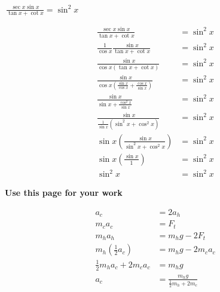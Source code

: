 \documentclass[addpoints]{exam}
\begin{document}
\begin{tcolorbox}[breakable, title=TRIG IDENTITIES, colframe=black, sharp corners, colback=white, colbacktitle=white, coltitle=black]
\begin{questions}
            \question \(\displaystyle\, \frac{\sec x \sin x}{\tan x + \cot x} = \sin^2 x\)
            \begin{solution}[\stretch{1}]
              \begin{align*}
                \frac{\sec x \sin x}{\tan x + \cot x} &= \sin^2 x \\ 
                \frac{1}{\cos x}\frac{\sin x}{\tan x + \cot x} &= \sin^2 x \\ 
                \frac{\sin x}{\cos x\left(\tan x + \cot x\right)} &= \sin^2 x \\ 
                \frac{\sin x}{\cos x \left(\frac{\sin x}{\cos x} + \frac{\cos x}{\sin x}\right)}& = \sin^2 x \\ 
                \frac{\sin x}{\sin x + \frac{\cos^2 x}{\sin x}} &= \sin^2 x \\ 
                \frac{\sin x}{\frac{1}{\sin x}\left(\sin^2 x + \cos^2 x\right)} &= \sin^2 x \\ 
                \sin x\left(\frac{\sin x}{\sin^2 x + \cos^2 x}\right) &= \sin^2 x \\ 
                \sin x\left(\frac{\sin x}{1}\right) &= \sin^2 x \\ 
                \sin^2 x &= \sin^2 x
              \end{align*}
            \end{solution}
        \end{questions}
    \end{tcolorbox}
    \ifprintanswers
    \else 
    \newpage 
      \begin{center}
        \large\textbf{Use this page for your work}
      \end{center}
    \fi

    \newpage 
    \begin{align}
      a_c &= 2a_h \\ 
      m_{c}a_{c} &= F_t \\ 
      m_{h}a_{h} &= m_{h}g - 2F_t \\ 
      m_{h}\left(\frac{1}{2}a_c\right) &= m_{h}g-2m_{c}a_{c} \\ 
      \frac{1}{2}m_{h}a_{c} + 2m_{c}a_{c} &= m_{h}g \\ 
      a_c &= \boxed{\frac{m_{h}g}{\frac{1}{2}m_{h} + 2m_c}}
    \end{align}
\end{document}
